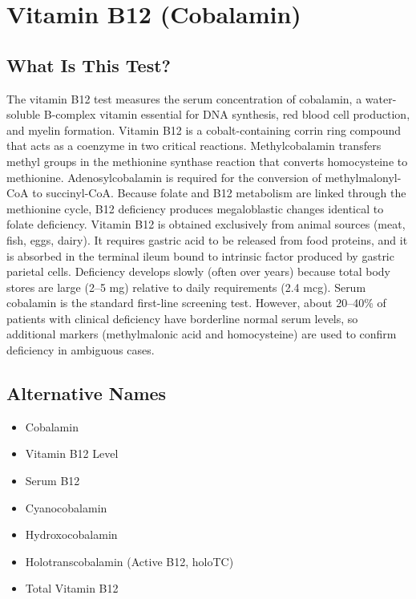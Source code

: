 \chapter{Vitamin B12 (Cobalamin)}

\section*{What Is This Test?}
The vitamin B12 test measures the serum concentration of cobalamin, a water-soluble B-complex vitamin essential for DNA synthesis, red blood cell production, and myelin formation. Vitamin B12 is a cobalt-containing corrin ring compound that acts as a coenzyme in two critical reactions. Methylcobalamin transfers methyl groups in the methionine synthase reaction that converts homocysteine to methionine. Adenosylcobalamin is required for the conversion of methylmalonyl-CoA to succinyl-CoA. Because folate and B12 metabolism are linked through the methionine cycle, B12 deficiency produces megaloblastic changes identical to folate deficiency. Vitamin B12 is obtained exclusively from animal sources (meat, fish, eggs, dairy). It requires gastric acid to be released from food proteins, and it is absorbed in the terminal ileum bound to intrinsic factor produced by gastric parietal cells. Deficiency develops slowly (often over years) because total body stores are large (2--5 mg) relative to daily requirements (2.4 mcg). Serum cobalamin is the standard first-line screening test. However, about 20--40\% of patients with clinical deficiency have borderline normal serum levels, so additional markers (methylmalonic acid and homocysteine) are used to confirm deficiency in ambiguous cases.

\section*{Alternative Names}
\begin{itemize}
  \item Cobalamin
  \item Vitamin B12 Level
  \item Serum B12
  \item Cyanocobalamin
  \item Hydroxocobalamin
  \item Holotranscobalamin (Active B12, holoTC)
  \item Total Vitamin B12
\end{itemize}
